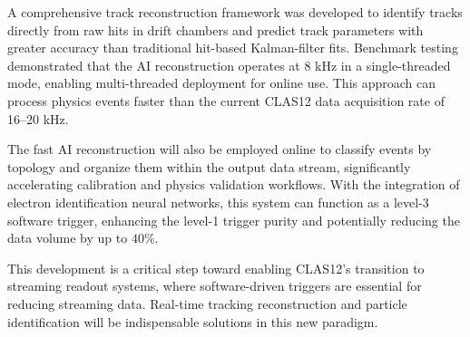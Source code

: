 \documentclass{webofc}
\begin{document}
A comprehensive track reconstruction framework was developed to identify tracks directly from raw hits in drift chambers and predict track parameters with greater accuracy than traditional hit-based Kalman-filter fits. Benchmark testing demonstrated that the AI reconstruction operates at 8 kHz in a single-threaded mode, enabling multi-threaded deployment for online use. This approach can process physics events faster than the current CLAS12 data acquisition rate of 16–20 kHz.

The fast AI reconstruction will also be employed online to classify events by topology and organize them within the output data stream, significantly accelerating calibration and physics validation workflows. With the integration of electron identification neural networks, this system can function as a level-3 software trigger, enhancing the level-1 trigger purity and potentially reducing the data volume by up to $40\%$.

This development is a critical step toward enabling CLAS12's transition to streaming readout systems, where software-driven triggers are essential for reducing streaming data. Real-time tracking reconstruction and particle identification will be indispensable solutions in this new paradigm.

\end{document}
